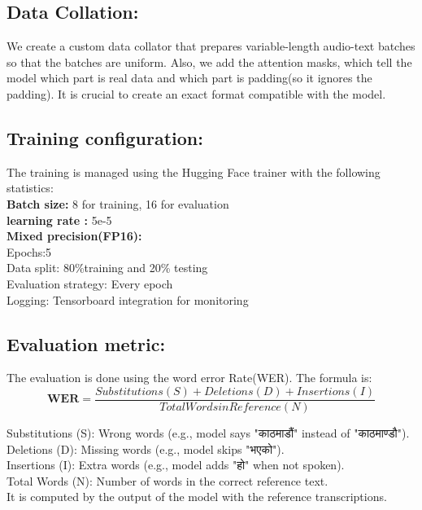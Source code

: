  \subsection{Data Collation:} We create a custom data collator that prepares variable-length audio-text batches so that the batches are uniform. Also, we add the attention masks, which tell the model which part is real data and which part is padding(so it ignores the padding). It is crucial to create an exact format compatible with the model. \\
 \subsection{Training configuration:}
 The training is managed using the Hugging Face trainer with the following statistics:\\
 \textbf{Batch size:} 8 for training, 16 for evaluation\\
 \textbf{learning rate :} 5e-5\\
 \textbf{Mixed precision(FP16):} \\
 Epochs:5\\
 Data split: 80\%training and 20\% testing \\
 Evaluation strategy: Every epoch \\
 Logging: Tensorboard integration for monitoring\\
 

 \subsection{Evaluation metric:} The evaluation is done using the word error Rate(WER).
 The formula is:\\
 \begin{equation}
     \textbf{WER} = \frac{Substitutions (S) + Deletions (D) + Insertions (I)}{ Total Words in Reference (N)}
 \end{equation}

              

Substitutions (S): Wrong words (e.g., model says "काठमाडौं" instead of "काठमाण्डौ").\\
Deletions (D): Missing words (e.g., model skips "भएको").\\
Insertions (I): Extra words (e.g., model adds "हो" when not spoken).\\
Total Words (N): Number of words in the correct reference text.\\

It is computed by the output of the model with the reference transcriptions.

